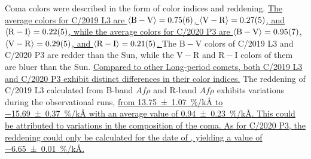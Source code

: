 Coma colors were described in the form of color indices and reddening. 
\ul{
    The average colors for C/2019 L3 are  
$\langle \mathrm{B} - \mathrm{V} \rangle = \num{0.75 +- 0.06}$, 
$\langle \mathrm{V} - \mathrm{R} \rangle = \num{0.27 +- 0.05}$, and 
$\langle \mathrm{R} - \mathrm{I} \rangle = \num{0.22 +- 0.05}$,  
while the average colors for C/2020 P3 are 
$\langle \mathrm{B} - \mathrm{V} \rangle = \num{0.95 +- 0.07}$, 
$\langle \mathrm{V} - \mathrm{R} \rangle = \num{0.29 +- 0.05}$, and 
$\langle \mathrm{R} - \mathrm{I} \rangle = \num{0.21 +- 0.05}$. 
}
The $\mathrm{B} - \mathrm{V}$ colors of C/2019 L3 and C/2020 P3 are redder than the Sun, while the $\mathrm{V} - \mathrm{R}$ and $\mathrm{R} - \mathrm{I}$ colors of them are bluer than the Sun. \ul{Compared to other Long-period comets, both C/2019 L3 and C/2020 P3 exhibit distinct differences in their color indices.} The reddening of C/2019 L3 calculated from B-band $Af\rho$ and R-band $Af\rho$ exhibits variations during the observational runs, \ul{from {\SI{13.75 +- 1.07}{\percent/\kilo\angstrom}} to {\SI{-15.69 +- 0.37}{\percent/\kilo\angstrom}} with an average value of {\SI{0.94 +- 0.23}{\percent/\kilo\angstrom}}. This could be attributed to  variations in the composition of the coma. As for C/2020 P3, the reddening could only be calculated for the date of , yielding a value of {\SI{-6.65 +- 0.01}{\percent/\kilo\angstrom}}. 
}

